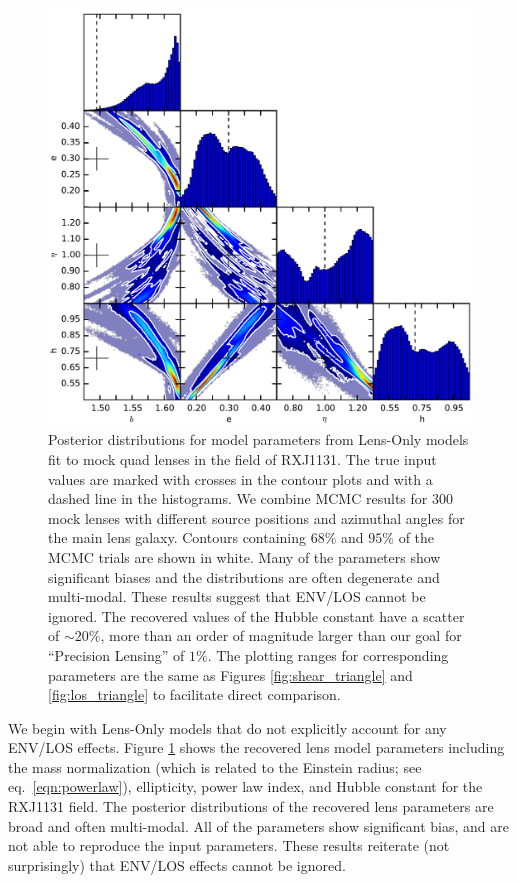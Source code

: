 \documentclass{emulateapj}
\begin{document}
\begin{figure}[ht]
\begin{center}
\includegraphics[width=1\textwidth]{all_none_1e-2.pdf}
\caption{\label{fig:none_triangle} Posterior distributions for model parameters from Lens-Only models fit to mock quad lenses in the field of RXJ1131. The true input values are marked with crosses in the contour plots and with a dashed line in the histograms. We combine MCMC results for 300 mock lenses with different source positions and azimuthal angles for the main lens galaxy.  Contours containing $68\%$ and $95\%$ of the MCMC trials are shown in white. Many of the parameters show significant biases and the distributions are often degenerate and multi-modal. These results suggest that ENV/LOS cannot be ignored. The recovered values of the Hubble constant have a scatter of $\sim 20\%$, more than an order of magnitude larger than our goal for ``Precision Lensing'' of $1\%$. The plotting ranges for corresponding parameters are the same as Figures \ref{fig:shear_triangle} and \ref{fig:los_triangle} to facilitate direct comparison.
}
\end{center}
\end{figure}

We begin with Lens-Only models that do not explicitly account for any ENV/LOS effects. Figure \ref{fig:none_triangle} shows the recovered lens model parameters including the mass normalization (which is related to the Einstein radius; see eq.\ \ref{eqn:powerlaw}), ellipticity, power law index, and Hubble constant for the RXJ1131 field. The posterior distributions of the recovered lens parameters are broad and often multi-modal. All of the parameters show significant bias, and are not able to reproduce the input parameters. These results reiterate (not surprisingly) that ENV/LOS effects cannot be ignored.
\end{document}
